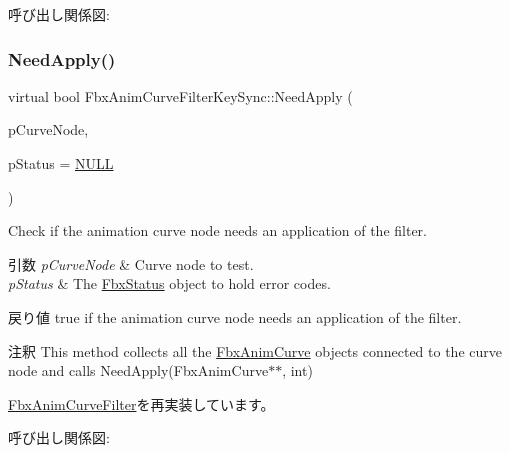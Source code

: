 呼び出し関係図\+:
\mbox{\label{class_fbx_anim_curve_filter_key_sync_a72cb983cb554a070688eb0990d4b7576}} 
\subsubsection{\texorpdfstring{Need\+Apply()}{NeedApply()}\hspace{0.1cm}{\footnotesize\ttfamily [3/5]}}
{\footnotesize\ttfamily virtual bool Fbx\+Anim\+Curve\+Filter\+Key\+Sync\+::\+Need\+Apply (\begin{DoxyParamCaption}\item[{\hyperlink{class_fbx_anim_curve_node}{Fbx\+Anim\+Curve\+Node} \&}]{p\+Curve\+Node,  }\item[{\hyperlink{class_fbx_status}{Fbx\+Status} $\ast$}]{p\+Status = {\ttfamily \hyperlink{fbxarch_8h_a070d2ce7b6bb7e5c05602aa8c308d0c4}{N\+U\+LL}} }\end{DoxyParamCaption})\hspace{0.3cm}{\ttfamily [virtual]}}

Check if the animation curve node needs an application of the filter. 
\begin{DoxyParams}{引数}
{\em p\+Curve\+Node} & Curve node to test. \\
\hline
{\em p\+Status} & The \hyperlink{class_fbx_status}{Fbx\+Status} object to hold error codes. \\
\hline
\end{DoxyParams}
\begin{DoxyReturn}{戻り値}
{\ttfamily true} if the animation curve node needs an application of the filter. 
\end{DoxyReturn}
\begin{DoxyRemark}{注釈}
This method collects all the \hyperlink{class_fbx_anim_curve}{Fbx\+Anim\+Curve} objects connected to the curve node and calls Need\+Apply(\+Fbx\+Anim\+Curve$\ast$$\ast$, int) 
\end{DoxyRemark}


\hyperlink{class_fbx_anim_curve_filter_a2a88d855d34bb1f2f22ca8386020b33a}{Fbx\+Anim\+Curve\+Filter}を再実装しています。

呼び出し関係図\+:
\mbox{\label{class_fbx_anim_curve_filter_key_sync_aa26aa6ed4121353882589902fb0db961}} 
